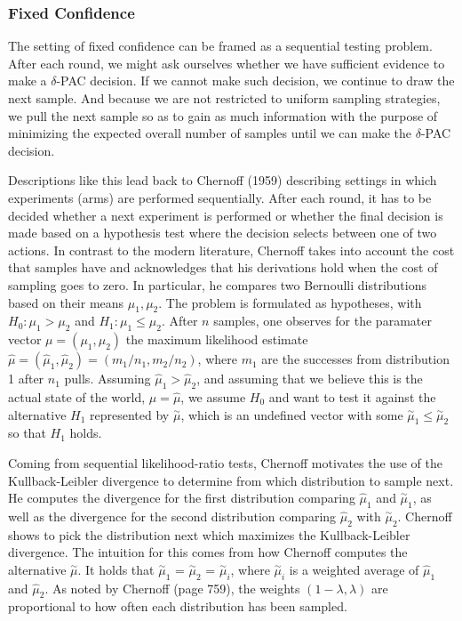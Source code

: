 \documentclass[12pt,]{article}
\begin{document}
\subsubsection{Fixed Confidence}\label{fixed-confidence}

The setting of fixed confidence can be framed as a sequential testing
problem. After each round, we might ask ourselves whether we have
sufficient evidence to make a \(\delta\)-PAC decision. If we cannot make
such decision, we continue to draw the next sample. And because we are
not restricted to uniform sampling strategies, we pull the next sample
so as to gain as much information with the purpose of minimizing the
expected overall number of samples until we can make the \(\delta\)-PAC
decision.

Descriptions like this lead back to Chernoff (1959) describing settings
in which experiments (arms) are performed sequentially. After each
round, it has to be decided whether a next experiment is performed or
whether the final decision is made based on a hypothesis test where the
decision selects between one of two actions. In contrast to the modern
literature, Chernoff takes into account the cost that samples have and
acknowledges that his derivations hold when the cost of sampling goes to
zero. In particular, he compares two Bernoulli distributions based on
their means \(\mu_1, \mu_2\). The problem is formulated as hypotheses,
with \(H_0: \mu_1 > \mu_2\) and \(H_1: \mu_1 \leq \mu_2\). After \(n\)
samples, one observes for the paramater vector \(\mu = (\mu_1, \mu_2)\)
the maximum likelihood estimate
\(\hat{\mu} = (\hat{\mu}_1, \hat{\mu}_2)=(m_1/n_1, m_2/n_2)\), where
\(m_1\) are the successes from distribution 1 after \(n_1\) pulls.
Assuming \(\hat{\mu}_1 > \hat{\mu}_2\), and assuming that we believe
this is the actual state of the world, \(\mu =\hat{\mu}\), we assume
\(H_0\) and want to test it against the alternative \(H_1\) represented
by \(\stackrel{\sim}{\mu}\), which is an undefined vector with some
\(\stackrel{\sim}{\mu}_1 \leq \stackrel{\sim}{\mu}_2\) so that \(H_1\)
holds.

Coming from sequential likelihood-ratio tests, Chernoff motivates the
use of the Kullback-Leibler divergence to determine from which
distribution to sample next. He computes the divergence for the first
distribution comparing \(\hat{\mu}_1\) and \(\stackrel{\sim}{\mu}_1\),
as well as the divergence for the second distribution comparing
\(\hat{\mu}_2\) with \(\stackrel{\sim}{\mu}_2\). Chernoff shows to pick
the distribution next which maximizes the Kullback-Leibler divergence.
The intuition for this comes from how Chernoff computes the alternative
\(\stackrel{\sim}{\mu}\). It holds that \(\stackrel{\sim}{\mu}_1\) =
\(\stackrel{\sim}{\mu}_2\) = \(\stackrel{\sim}{\mu}_i\), where
\(\stackrel{\sim}{\mu}_i\) is a weighted average of \(\hat{\mu}_1\) and
\(\hat{\mu}_2\). As noted by Chernoff (page 759), the weights
\((1-\lambda, \lambda)\) are proportional to how often each distribution
has been sampled.
\end{document}
